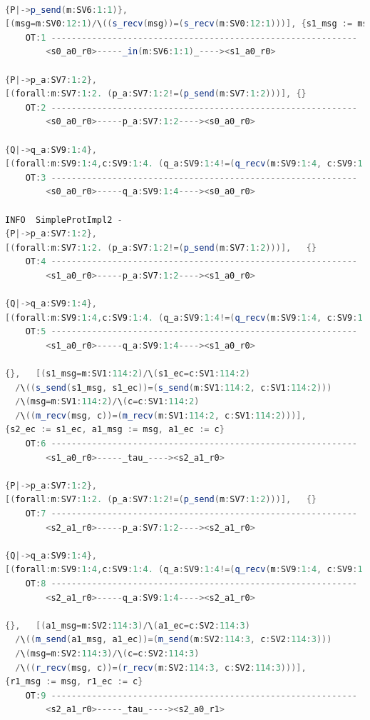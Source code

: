 \documentclass{lmcs}
\begin{document}
\begin{lstlisting}[basicstyle=\scriptsize\ttfamily, language=java, frame=single]

{P|->p_send(m:SV6:1:1)},
[(msg=m:SV0:12:1)/\((s_recv(msg))=(s_recv(m:SV0:12:1)))], {s1_msg := msg, s1_ec := 0}
	OT:1 ------------------------------------------------------------
		<s0_a0_r0>-----_in(m:SV6:1:1)_----><s1_a0_r0>

{P|->p_a:SV7:1:2},
[(forall:m:SV7:1:2. (p_a:SV7:1:2!=(p_send(m:SV7:1:2)))], {}
	OT:2 ------------------------------------------------------------
		<s0_a0_r0>-----p_a:SV7:1:2----><s0_a0_r0>

{Q|->q_a:SV9:1:4},
[(forall:m:SV9:1:4,c:SV9:1:4. (q_a:SV9:1:4!=(q_recv(m:SV9:1:4, c:SV9:1:4)))],   {}
	OT:3 ------------------------------------------------------------
		<s0_a0_r0>-----q_a:SV9:1:4----><s0_a0_r0>

INFO  SimpleProtImpl2 - 
{P|->p_a:SV7:1:2},
[(forall:m:SV7:1:2. (p_a:SV7:1:2!=(p_send(m:SV7:1:2)))],   {}
	OT:4 ------------------------------------------------------------
		<s1_a0_r0>-----p_a:SV7:1:2----><s1_a0_r0>

{Q|->q_a:SV9:1:4},
[(forall:m:SV9:1:4,c:SV9:1:4. (q_a:SV9:1:4!=(q_recv(m:SV9:1:4, c:SV9:1:4)))],   {}
	OT:5 ------------------------------------------------------------
		<s1_a0_r0>-----q_a:SV9:1:4----><s1_a0_r0>

{},   [(s1_msg=m:SV1:114:2)/\(s1_ec=c:SV1:114:2)
  /\((s_send(s1_msg, s1_ec))=(s_send(m:SV1:114:2, c:SV1:114:2)))
  /\(msg=m:SV1:114:2)/\(c=c:SV1:114:2)
  /\((m_recv(msg, c))=(m_recv(m:SV1:114:2, c:SV1:114:2)))],
{s2_ec := s1_ec, a1_msg := msg, a1_ec := c}
	OT:6 ------------------------------------------------------------
		<s1_a0_r0>-----_tau_----><s2_a1_r0>

{P|->p_a:SV7:1:2},
[(forall:m:SV7:1:2. (p_a:SV7:1:2!=(p_send(m:SV7:1:2)))],   {}
	OT:7 ------------------------------------------------------------
		<s2_a1_r0>-----p_a:SV7:1:2----><s2_a1_r0>

{Q|->q_a:SV9:1:4},
[(forall:m:SV9:1:4,c:SV9:1:4. (q_a:SV9:1:4!=(q_recv(m:SV9:1:4, c:SV9:1:4)))],   {}
	OT:8 ------------------------------------------------------------
		<s2_a1_r0>-----q_a:SV9:1:4----><s2_a1_r0>

{},   [(a1_msg=m:SV2:114:3)/\(a1_ec=c:SV2:114:3)
  /\((m_send(a1_msg, a1_ec))=(m_send(m:SV2:114:3, c:SV2:114:3)))
  /\(msg=m:SV2:114:3)/\(c=c:SV2:114:3)
  /\((r_recv(msg, c))=(r_recv(m:SV2:114:3, c:SV2:114:3)))],
{r1_msg := msg, r1_ec := c}
	OT:9 ------------------------------------------------------------
		<s2_a1_r0>-----_tau_----><s2_a0_r1>


\end{lstlisting}
\end{document}
